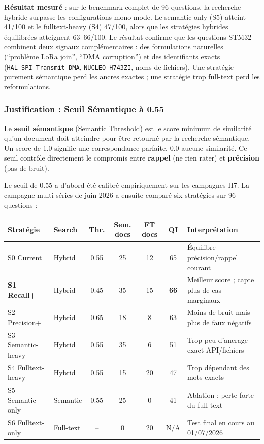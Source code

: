 \textbf{Résultat mesuré} : sur le benchmark complet de 96 questions, la recherche hybride surpasse les configurations mono-mode. Le semantic-only (S5) atteint 41/100 et le fulltext-heavy (S4) 47/100, alors que les stratégies hybrides équilibrées atteignent 63--66/100. Le résultat confirme que les questions STM32 combinent deux signaux complémentaires : des formulations naturelles (``problème LoRa join'', ``DMA corruption'') et des identifiants exacts (\texttt{HAL\_SPI\_Transmit\_DMA}, \texttt{NUCLEO-H743ZI}, noms de fichiers). Une stratégie purement sémantique perd les ancres exactes ; une stratégie trop full-text perd les reformulations.

\subsubsection{Justification : Seuil Sémantique à 0.55}
\label{sec:seuil_semantique}

Le \textbf{seuil sémantique} (Semantic Threshold) est le score minimum de similarité qu'un document doit atteindre pour être retourné par la recherche sémantique. Un score de 1.0 signifie une correspondance parfaite, 0.0 aucune similarité. Ce seuil contrôle directement le compromis entre \textbf{rappel} (ne rien rater) et \textbf{précision} (pas de bruit).

Le seuil de 0.55 a d'abord été calibré empiriquement sur les campagnes H7. La campagne multi-séries de juin 2026 a ensuite comparé six stratégies sur 96 questions :

\begin{longtable}{p{2cm}p{2cm}ccccp{4.3cm}}
\toprule
\textbf{Stratégie} & \textbf{Search} & \textbf{Thr.} & \textbf{Sem. docs} & \textbf{FT docs} & \textbf{QI} & \textbf{Interprétation} \\
\midrule
S0 Current & Hybrid & 0.55 & 25 & 12 & 65 & Équilibre précision/rappel courant \\
\textbf{S1 Recall+} & Hybrid & 0.45 & 35 & 15 & \textbf{66} & Meilleur score ; capte plus de cas marginaux \\
S2 Precision+ & Hybrid & 0.65 & 18 & 8 & 63 & Moins de bruit mais plus de faux négatifs \\
S3 Semantic-heavy & Hybrid & 0.55 & 35 & 6 & 51 & Trop peu d'ancrage exact API/fichiers \\
S4 Fulltext-heavy & Hybrid & 0.55 & 15 & 20 & 47 & Trop dépendant des mots exacts \\
S5 Semantic-only & Semantic & 0.55 & 25 & 0 & 41 & Ablation : perte forte du full-text \\
S6 Fulltext-only & Full-text & -- & 0 & 20 & N/A & Test final en cours au 01/07/2026 \\
\bottomrule
\end{longtable}


